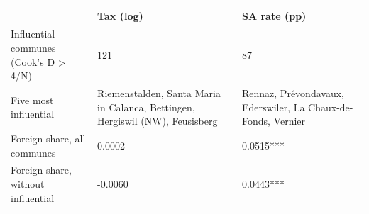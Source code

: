 \begin{tabular}{lll}
\toprule
 & Tax (log) & SA rate (pp) \\
\midrule
Influential communes (Cook's D > 4/N) & 121 & 87 \\
Five most influential & Riemenstalden, Santa Maria in Calanca, Bettingen, Hergiswil (NW), Feusisberg & Rennaz, Prévondavaux, Ederswiler, La Chaux-de-Fonds, Vernier \\
Foreign share, all communes & 0.0002 & 0.0515*** \\
Foreign share, without influential & -0.0060 & 0.0443*** \\
\bottomrule
\end{tabular}
